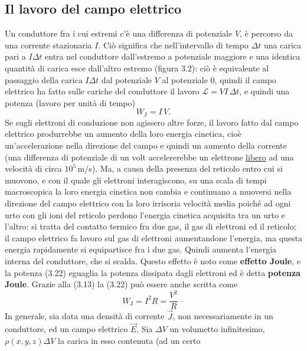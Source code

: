 \subsection{Il lavoro del campo elettrico}

Un conduttore fra i cui estremi c'\`e una differenza di potenziale $V$, \`e
percorso da una corrente stazionaria $I$. Ci\`o significa che nell'intervallo di
tempo $\Delta t$ una carica pari a $I\Delta t$ entra nel conduttore dall'estremo
a potenziale maggiore e una identica quantit\`a di carica esce dall'altro
estremo (figura 3.2): ci\`o \`e equivalente al passaggio della carica
$I\Delta t$ dal potenziale $V$ al potenziale 0, quindi il campo elettrico ha
fatto sulle cariche del conduttore il lavoro $\mathcal L=VI\,\Delta t$, e quindi
una potenza (lavoro per unit\`a di tempo)
\begin{equation}
  W_\mathrm J=I\,V.
  \tag{3.22}
\end{equation}
Se sugli elettroni di conduzione non agissero altre forze, il lavoro fatto dal
campo elettrico produrrebbe un aumento della loro energia cinetica, cio\`e
un'accelerazione nella direzione del campo e quindi un aumento della corrente
(una differenza di potenziale di un volt accelererebbe un elettrone
\underline{libero} ad una velocit\`a di circa $10^5$\,m/s). Ma, a causa della
presenza del reticolo entro cui si muovono, e con il quale gli elettroni
interagiscono, su una scala di tempi macroscopica la loro energia cinetica non
cambia e continuano a muoversi nella direzione del campo elettrico con la loro
irrisoria velocit\`a media poich\'e ad ogni urto con gli ioni del reticolo
perdono l'energia cinetica acquisita tra un urto e l'altro: si tratta del
contatto termico fra due gas, il gas di elettroni ed il reticolo; il campo
elettrico fa lavoro sul gas di elettroni aumentandone l'energia, ma questa
energia rapidamente si equipartisce fra i due gas. Quindi aumenta l'energia
interna del conduttore, che si scalda. Questo effetto \`e noto come
\textbf{effetto Joule}, e la potenza (3.22) eguaglia la potenza dissipata dagli
elettroni ed \`e detta \textbf{potenza Joule}. Grazie alla (3.13) la (3.22)
pu\`o essere anche scritta come
\begin{equation}
  W_\mathrm J=I^2R=\frac{V^2}{R}\,\cdot
  \tag{3.22'}
\end{equation}
In generale, sia data una densit\`a di corrente $\vec J$, non necessariamente in
un conduttore, ed un campo elettrico $\vec E$. Sia $\Delta V$ un volumetto
infinitesimo, $\rho(x,y,z)\Delta V$ la carica in esso contenuta (ad un certo

